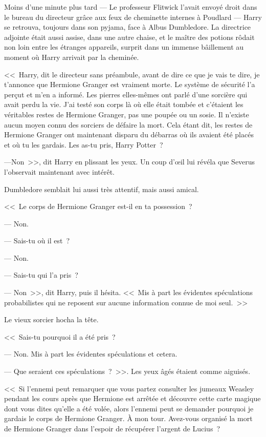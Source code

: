 Moins d'une minute plus tard — Le professeur Flitwick l'avait envoyé droit dans le bureau du directeur grâce aux feux de cheminette internes à Poudlard — Harry se retrouva, toujours dans son pyjama, face à Albus Dumbledore. La directrice adjointe était aussi assise, dans une autre chaise, et le maître des potions rôdait non loin entre les étranges appareils, surprit dans un immense bâillement au moment où Harry arrivait par la cheminée.

<<~Harry, dit le directeur sans préambule, avant de dire ce que je vais te dire, je t'annonce que Hermione Granger est vraiment morte. Le système de sécurité l'a perçut et m'en a informé. Les pierres elles-mêmes ont parlé d'une sorcière qui avait perdu la vie. J'ai testé son corps là où elle était tombée et c'étaient les véritables restes de Hermione Granger, pas une poupée ou un sosie. Il n'existe aucun moyen connu des sorciers de défaire la mort. Cela étant dit, les restes de Hermione Granger ont maintenant disparu du débarras où ils avaient été placés et où tu les gardais. Les as-tu pris, Harry Potter~?

---Non~>>, dit Harry en plissant les yeux. Un coup d'œil lui révéla que Severus l'observait maintenant avec intérêt.

Dumbledore semblait lui aussi très attentif, mais aussi amical.

<<~Le corps de Hermione Granger est-il en ta possession~?

--- Non.

--- Sais-tu où il est~?

--- Non.

--- Sais-tu qui l'a pris~?

--- Non~>>, dit Harry, puis il hésita. <<~Mis à part les évidentes spéculations probabilistes qui ne reposent sur aucune information connue de moi seul.~>>

Le vieux sorcier hocha la tête.

<<~Sais-tu pourquoi il a été pris~?

--- Non. Mis à part les évidentes spéculations et cetera.

--- Que seraient ces spéculations~?~>>. Les yeux âgés étaient comme aiguisés.

<<~Si l'ennemi peut remarquer que vous partez consulter les jumeaux Weasley pendant les cours après que Hermione est arrêtée et découvre cette carte magique dont vous dites qu'elle a été volée, alors l'ennemi peut se demander pourquoi je gardais le corps de Hermione Granger. À mon tour. Avez-vous organisé la mort de Hermione Granger dans l'espoir de récupérer l'argent de Lucius~?

